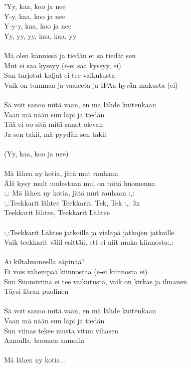 
"Yy, kaa, koo ja nee\\
Y-y, kaa, koo ja nee\\
Y-y-y, kaa, koo ja nee\\
Yy, yy, yy, kaa, kaa, yy
\\ \hspace{10mm} \\

Mä olen kännissä ja tiedän et sä tiedät sen\\
Mut ei saa kyssyy (e-ei saa kyssyy, ei)\\
Sun tarjotut kaljat ei tee vaikutusta\\
Vaik on tummaa ja vaaleeta ja IPAa hyvän makusta (ei)\\ \hspace{10mm} \\

Sä voit sanoo mitä vaan, en mä lähde kuitenkaan\\
Vaan mä nään sun läpi ja tiedän\\
Tää ei oo sitä mitä sanot olevan\\
Ja sen takii, mä pyydän sen takii
\\ \hspace{10mm} \\

(Yy, kaa, koo ja nee)
\\ \hspace{10mm} \\

Mä lähen ny kotia, jätä mut rauhaan\\
Älä kysy mult uudestaan mul on töitä huomenna\\
:,: Mä lähen ny kotia, jätä mut rauhaan :,:\\

:,:Teekkarit lähtee 
Teekkarit, Tek, Tek :,: 3x \\
Teekkarit lähtee, Teekkarit Lähtee 
\\ \hspace{10mm} \\


:,:Teekkarit Lähtee jatkoille ja vieläpä jatkojen jatkoille \\
Vaik teekkarit välil esittää,
ett ei niit muka kiinnosta:,: 
\\ \hspace{10mm} \\


Ai kiltahuoneella säpinää? \\
Ei vois vähempää kiinnostaa (e-ei kiinnosta ei)\\
Sun Suomiviina ei tee vaikutusta, vaik on kirkas ja ilmanen \\
Täysi litran puolinen 
\\ \hspace{10mm} \\

Sä voit sanoo mitä vaan, en mä lähde kuitenkaan \\
Vaan mä nään sun läpi ja tiedän\\
Sun viinas tekee musta vitun vihasen\\
Aamulla, huomen aamulla
\\ \hspace{10mm} \\

Mä lähen ny kotia...
